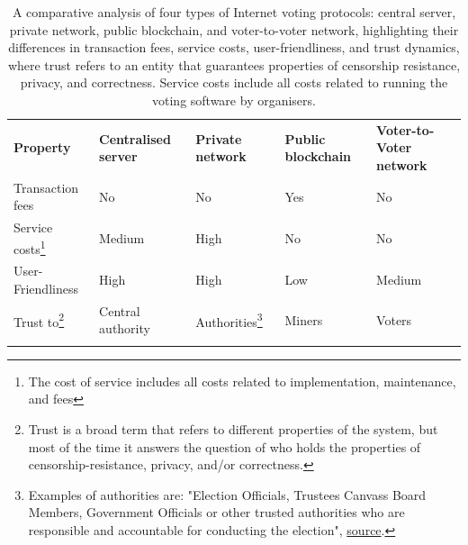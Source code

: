 \documentclass[runningheads]{llncs}
\begin{document}
\begin{table}[!h]
\centering
\newcommand{\YES}{\cellcolor{red!50}Yes}
\newcommand{\NO}{\cellcolor{green!50}No}
\begin{tabular}{p{}p{}p{}p{}p{}}
\noalign{\smallskip}\hline\noalign{\smallskip}
\textbf{Property} & \textbf{Centralised server} & \textbf{Private network} & \textbf{Public blockchain} & \textbf{Voter-to-Voter network}\\
\noalign{\smallskip}\hline\noalign{\smallskip}
Transaction fees & \NO & \NO & \YES & \NO \\
\hline
Service costs\footnote{The cost of service includes all costs related to implementation, maintenance, and fees} & \cellcolor{yellow!50} Medium & \cellcolor{red!50} High & \cellcolor{green!50} No  & \cellcolor{green!50} No \\
\hline
User-Friendliness & \cellcolor{green!50} High & \cellcolor{green!50}High & \cellcolor{red!50} Low & \cellcolor{yellow!50} Medium \\
\hline
Trust to\footnote{Trust is a broad term that refers to different properties of the system, but most of the time it answers the question of who holds the properties of censorship-resistance, privacy, and/or correctness.} & \cellcolor{red!50} Central authority & \cellcolor{yellow!50} Authorities\footnote{Examples of authorities are: "Election Officials, Trustees Canvass Board Members, Government Officials or other trusted authorities who are responsible and accountable for conducting the election", \href{http://www.electionguard.vote/basics/steps/1_Key_Ceremony/}{source}.} & \cellcolor{yellow!50} Miners & \cellcolor{yellow!50} Voters  \\
\noalign{\smallskip}\hline
\hline
\end{tabular}

\caption{A comparative analysis of four types of Internet voting protocols: central server, private network, public blockchain, and voter-to-voter network, highlighting their differences in transaction fees, service costs, user-friendliness, and trust dynamics, where trust refers to an entity that guarantees properties of censorship resistance, privacy, and correctness. Service costs include all costs related to running the voting software by organisers.}
\label{table-comparision}

\end{table}
\end{document}
